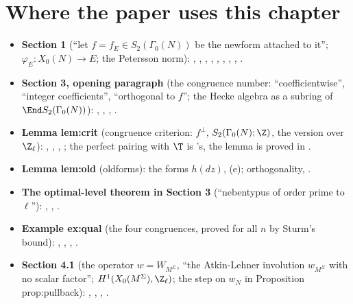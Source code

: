 \section*{Where the paper uses this chapter}

\begin{itemize}
\item \textbf{Section 1} (``let $f=f_E\in S_2(\Gamma_0(N))$ be the newform attached to it''; $\varphi_E\colon X_0(N)\to E$; the Petersson norm): , ,
, , , , , ,
.
\item \textbf{Section 3, opening paragraph} (the congruence number: ``coefficientwise'', ``integer coefficients'', ``orthogonal to $f$''; the Hecke algebra as a subring of
$\End S_2(\Gamma_0(N))$): , , , .
\item \textbf{Lemma lem:crit} (congruence criterion: $f^\perp$, $S_2(\Gamma_0(N);\Z)$, the version over $\Z_\ell$): , ,
, ; the perfect pairing with $\T$ is 's, the lemma is proved in .
\item \textbf{Lemma lem:old} (oldforms): the forms $h(dz)$, (e); orthogonality, .
\item \textbf{The optimal-level theorem in Section 3} (``nebentypus of order prime to $\ell$''): , , .
\item \textbf{Example ex:qual} (the four congruences, proved for all $n$ by Sturm's bound): , , ,
.
\item \textbf{Section 4.1} (the operator $w=W_{M^\Sigma}$, ``the Atkin-Lehner involution $w_{M^\Sigma}$ with no scalar factor''; $H^1(X_0(M^\Sigma),\Z_\ell)$; the step on $w_N$ in Proposition prop:pullback):
, , , .

\end{itemize}
